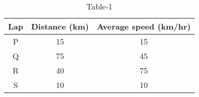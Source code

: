 \begin{table}[htbp]
\centering
\caption{Table-1}
\label{tab:tables/table1.tex}
\begin{tabular}{|c|c|c|}
\hline
Lap & Distance (km) & Average speed (km/hr) \\
\hline
P & 15 & 15 \\
Q & 75 & 45 \\
R & 40 & 75 \\
S & 10 & 10 \\
\hline
\end{tabular}\

\end{table}